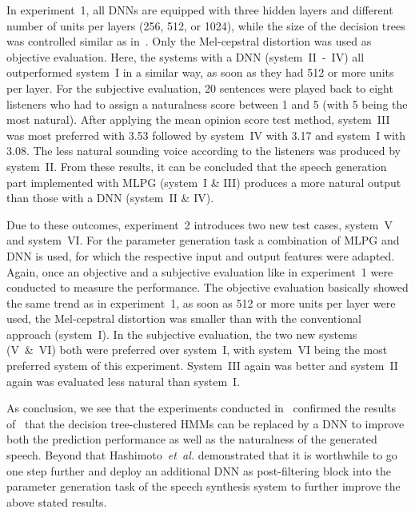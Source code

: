 \noindent In experiment~1, all \acp{DNN} are equipped with three hidden layers and different number of units per layers (256, 512, or 1024), while the size of the decision trees was controlled similar as in~\cite{zen:deepstatistical}. Only the Mel-cepstral distortion was used as objective evaluation. Here, the systems with a \ac{DNN} (system~II~-~IV) all outperformed system~I in a similar way, as soon as they had 512 or more units per layer. For the subjective evaluation, 20 sentences were played back to eight listeners who had to assign a naturalness score between 1 and 5 (with 5 being the most natural). After applying the mean opinion score test method, system~III was most preferred with 3.53 followed by system~IV with 3.17 and system~I with 3.08. The less natural sounding voice according to the listeners was produced by system~II. From these results, it can be concluded that the speech generation part implemented with \ac{MLPG} (system~I \& III) produces a more natural output than those with a \ac{DNN} (system~II \& IV).

Due to these outcomes, experiment~2 introduces two new test cases, system~V and system~VI. For the parameter generation task a combination of \ac{MLPG} and \ac{DNN} is used, for which the respective input and output features were adapted. Again, once an objective and a subjective evaluation like in experiment~1 were conducted to measure the performance. The objective evaluation basically showed the same trend as in experiment~1, as soon as 512 or more units per layer were used, the Mel-cepstral distortion was smaller than with the conventional approach (system~I). In the subjective evaluation, the two new systems (V~\&~VI) both were preferred over system~I, with system~VI being the most preferred system of this experiment. System~III again was better and system~II again was evaluated less natural than system~I.

As conclusion, we see that the experiments conducted in~\cite{hashimoto:effect} confirmed the results of~\cite{zen:deepstatistical} that the decision tree-clustered \acp{HMM} can be replaced by a \ac{DNN} to improve both the prediction performance as well as the naturalness of the generated speech. Beyond that Hashimoto~\textit{et~al.} demonstrated that it is worthwhile to go one step further and deploy an additional \ac{DNN} as post-filtering block into the parameter generation task of the speech synthesis system to further improve the above stated results.


